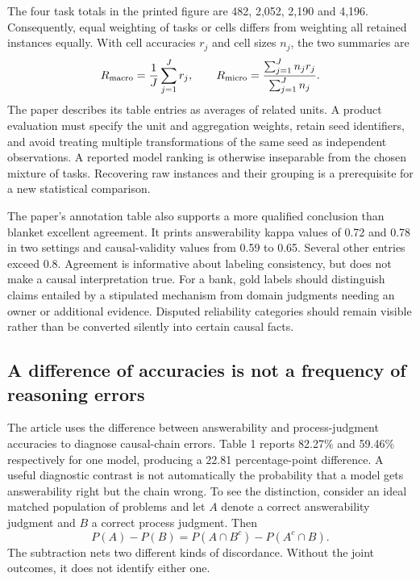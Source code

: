 The four task totals in the printed figure are 482, 2,052, 2,190 and 4,196. Consequently, equal weighting of tasks or cells differs from weighting all retained instances equally. With cell accuracies $r_j$ and cell sizes $n_j$, the two summaries are
\begin{equation}
 R_{\rm macro}=\frac{1}{J}\sum_{j=1}^J r_j,
 \qquad
 R_{\rm micro}=\frac{\sum_{j=1}^J n_j r_j}{\sum_{j=1}^J n_j}.
 \label{exec21:check-weights}
\end{equation}
The paper describes its table entries as averages of related units. A product evaluation must specify the unit and aggregation weights, retain seed identifiers, and avoid treating multiple transformations of the same seed as independent observations. A reported model ranking is otherwise inseparable from the chosen mixture of tasks. Recovering raw instances and their grouping is a prerequisite for a new statistical comparison.~\citep{exec21_causalitycheck,exec21_causalitycheck_reference}

The paper's annotation table also supports a more qualified conclusion than blanket excellent agreement. It prints answerability kappa values of 0.72 and 0.78 in two settings and causal-validity values from 0.59 to 0.65. Several other entries exceed 0.8. Agreement is informative about labeling consistency, but does not make a causal interpretation true. For a bank, gold labels should distinguish claims entailed by a stipulated mechanism from domain judgments needing an owner or additional evidence. Disputed reliability categories should remain visible rather than be converted silently into certain causal facts.~\citep{exec21_causalitycheck}

\subsection{A difference of accuracies is not a frequency of reasoning errors}
\label{exec21:check-paired}
The article uses the difference between answerability and process-judgment accuracies to diagnose causal-chain errors. Table 1 reports 82.27\% and 59.46\% respectively for one model, producing a 22.81 percentage-point difference. A useful diagnostic contrast is not automatically the probability that a model gets answerability right but the chain wrong. To see the distinction, consider an ideal matched population of problems and let $A$ denote a correct answerability judgment and $B$ a correct process judgment. Then
\begin{equation}
 P(A)-P(B)=P(A\cap B^c)-P(A^c\cap B).
 \label{exec21:check-difference}
\end{equation}
The subtraction nets two different kinds of discordance. Without the joint outcomes, it does not identify either one.~\citep{exec21_causalitycheck,exec21_causalitycheck_reference}

